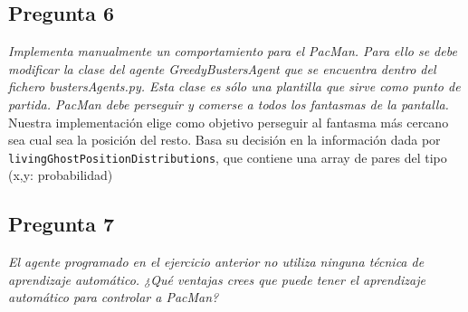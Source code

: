 \documentclass[12pt]{article}
\begin{document}
\subsection{Pregunta 6}

\emph{Implementa manualmente un comportamiento para el PacMan. Para ello se
debe modificar la clase del agente GreedyBustersAgent que se encuentra dentro
del fichero bustersAgents.py. Esta clase es sólo una plantilla que sirve como
punto de partida. PacMan debe perseguir y comerse a todos los fantasmas de la
pantalla.}\\

Nuestra implementación elige como objetivo perseguir al fantasma más cercano
sea cual sea la posición del resto. Basa su decisión en la información dada por
\texttt{livingGhostPositionDistributions}, que contiene una array de pares del
tipo (x,y: probabilidad)

\subsection{Pregunta 7}

\emph{El agente programado en el ejercicio anterior no utiliza ninguna técnica
de aprendizaje automático. ¿Qué ventajas crees que puede tener el aprendizaje
automático para controlar a PacMan?}\\
\end{document}
